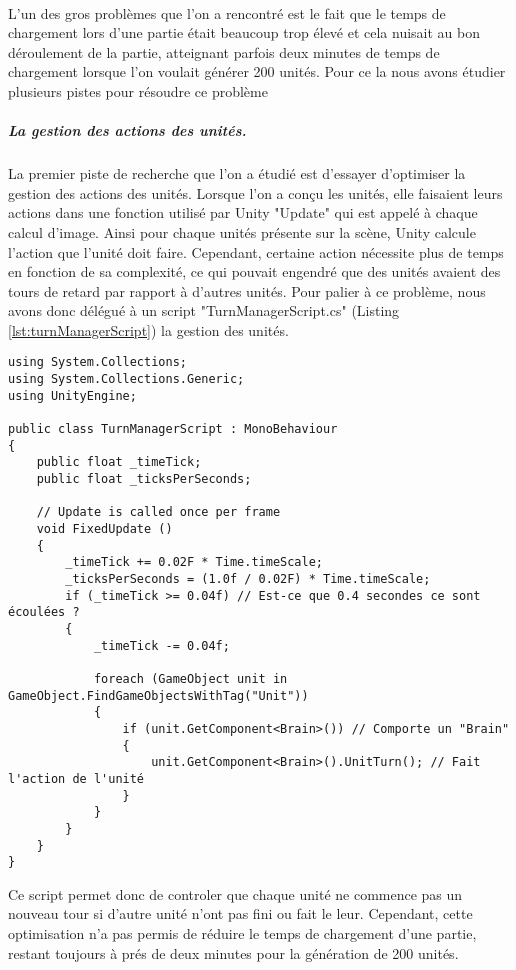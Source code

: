 \documentclass{report}
\begin{document}
\paragraph{} L'un des gros problèmes que l'on a rencontré est le fait que le temps de chargement lors d'une partie était beaucoup trop élevé et cela nuisait au bon déroulement de la partie, atteignant parfois deux minutes de temps de chargement lorsque l'on voulait générer 200 unités. Pour ce la nous avons étudier plusieurs pistes pour résoudre ce problème
\subparagraph{La gestion des actions des unités.}La premier piste de recherche que l'on a étudié est d'essayer d'optimiser la gestion des actions des unités. Lorsque l'on a conçu les unités, elle faisaient leurs actions dans une fonction utilisé par Unity "Update" qui est appelé à chaque calcul d'image. Ainsi pour chaque unités présente sur la scène, Unity calcule l'action que l'unité doit faire. Cependant, certaine action nécessite plus de temps en fonction de sa complexité, ce qui pouvait engendré que des unités avaient des tours de retard par rapport à d'autres unités. \newline
Pour palier à ce problème, nous avons donc délégué à un script  "TurnManagerScript.cs" (Listing \ref{lst:turnManagerScript}) la gestion des unités.\newline
 \begin{lstlisting}[language={[Sharp]C},label={lst:turnManagerScript}, caption= Code du script TurnManagerScript.cs]
using System.Collections;
using System.Collections.Generic;
using UnityEngine;

public class TurnManagerScript : MonoBehaviour
{
    public float _timeTick;
    public float _ticksPerSeconds;
    
    // Update is called once per frame
	void FixedUpdate ()
    {
        _timeTick += 0.02F * Time.timeScale;
        _ticksPerSeconds = (1.0f / 0.02F) * Time.timeScale;
        if (_timeTick >= 0.04f) // Est-ce que 0.4 secondes ce sont écoulées ?
        {
            _timeTick -= 0.04f;

            foreach (GameObject unit in GameObject.FindGameObjectsWithTag("Unit"))
            {
                if (unit.GetComponent<Brain>()) // Comporte un "Brain"
                {
                    unit.GetComponent<Brain>().UnitTurn(); // Fait l'action de l'unité
                }
            }
        }
	}
}
\end{lstlisting}
Ce script permet donc de controler que chaque unité ne commence pas un nouveau tour si d'autre unité n'ont pas fini ou fait le leur.
Cependant, cette optimisation n'a pas permis de réduire le temps de chargement d'une partie, restant toujours à prés de deux minutes pour la génération de 200 unités.
\end{document}
